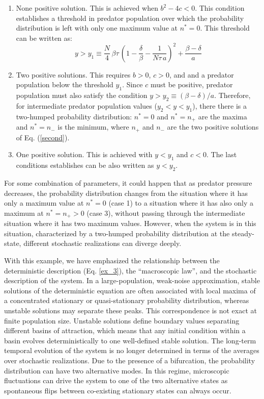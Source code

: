 \begin{enumerate}
\item None positive solution. This is achieved when $b^2 - 4c<0$. This condition establishes a threshold in predator population over which the probability distribution is left with only one maximum value at $n^{*}=0$. This threshold can be written as: 
\begin{equation}
y > y_{1} \equiv \frac{N}{4}\,\beta\tau\,\left(1-\frac{\delta}{\beta}-\frac{1}{N\tau\,a}\right)^2 + \frac{\beta-\delta}{a}
\end{equation}   
\item Two positive solutions. This requires $b>0$, $c>0$, and and a predator population below the threshold $y_{1}$. Since $c$ must be positive, predator population must also satisfy the condition $y > y_{2} \equiv (\beta-\delta)/a$. Therefore, for intermediate predator population values ($y_{2}<y<y_{1}$), there there is a two-humped probability distribution: $n^{*}=0$ and $n^{*}=n_{+}$ are the maxima and $n^{*}=n_{-}$ is the minimum, where $n_{+}$ and $n_{-}$ are the two positive solutions of Eq. (\ref{second}).  
\item One positive solution. This is achieved with $y<y_{1}$ and $c<0$. The last conditions establishes can be also written as $y<y_{2}$. 
\end{enumerate}
For some combination of parameters, it could happen that as predator pressure decreases, the probability distribution changes from the situation where it has only a maximum value at $n^{*}=0$ (case 1) to a situation where it has also only a maximum at $n^{*}=n_{+}>0$ (case 3), without passing through the intermediate situation where it has two maximum values. However, when the system is in this situation, characterized by a two-humped probability distribution at the steady-state, different stochastic realizations can diverge deeply.
\smallskip 
 
With this example, we have emphasized the relationship between the deterministic description (Eq. \ref{ex_3}), the ``macroscopic law'', and the stochastic description of the system. In a large-population, weak-noise approximation, stable solutions of the deterministic equation are often associated with local maxima of a concentrated stationary or quasi-stationary probability distribution, whereas unstable solutions may separate these peaks. This correspondence is not exact at finite population size. Unstable solutions define boundary values separating different basins of attraction, which means that any initial condition within a basin evolves deterministically to one well-defined stable solution. The long-term temporal evolution of the system is no longer determined in terms of the averages over stochastic realizations. Due to the presence of a bifurcation, the probability distribution can have two alternative modes. In this regime, microscopic fluctuations can drive the system to one of the two alternative states as spontaneous flips between co-existing stationary states can always occur. 



